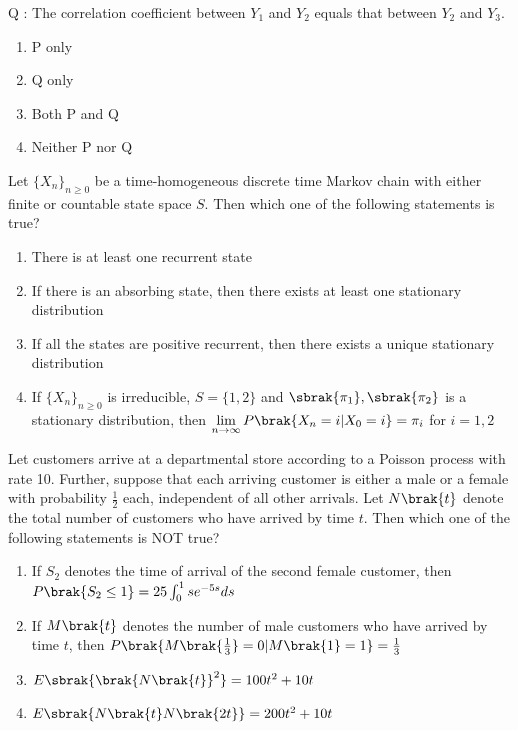Q : The correlation coefficient between $Y_1$ and $Y_2$ equals that between
$Y_2$ and $Y_3$.
\begin{enumerate}
    \item P only
    \item Q only
    \item Both P and Q
    \item Neither P nor Q \\ 
\end{enumerate}
\item Let $\{X_n\}_{n \geq 0}$ be a time-homogeneous discrete time Markov chain with either finite or countable state space $S$. Then which one of the following statements is true?
\begin{enumerate}
    \item There is at least one recurrent state
    \item If there is an absorbing state, then there exists at least one stationary distribution
    \item If all the states are positive recurrent, then there exists a unique stationary distribution
    \item If $\{X_n\}_{n \geq 0}$ is irreducible, $S = \{1, 2\}$ and $\sbrak{\pi_1}, \sbrak{\pi_2}$ is a stationary distribution, then $\lim\limits_{n\rightarrow\infty}P\brak{X_n = i|X_0 =i} = \pi_i$ for $i = 1, 2$ \\
\end{enumerate}
\item Let customers arrive at a departmental store according to a Poisson process with rate 10. Further, suppose that each arriving customer is either a male or a female with probability $\frac{1}{2}$ each, independent of all other arrivals. Let $N\brak{t}$ denote the total number of customers who have arrived by time $t$. Then which one of the following statements is NOT true?
\begin{enumerate}
    \item If $S_2$ denotes the time of arrival of the second female customer, then $P\brak{S_2 \leq 1} = 25\int_{0}^{1}se^{-5s} ds$
    \item If $M\brak{t}$ denotes the number of male customers who have arrived by time $t$, then $P\brak{M\brak{\frac{1}{3}} = 0|M\brak{1} = 1} = \frac{1}{3}$
    \item $E\sbrak{\brak{N\brak{t}}^2} = 100t^2 + 10t$
    \item $E\sbrak{N\brak{t}N\brak{2t}} = 200t^2 + 10t$ \\
\end{enumerate}
